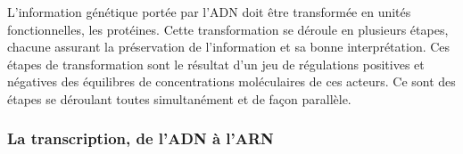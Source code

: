 L'information génétique portée par l'ADN doit être transformée en unités fonctionnelles, les protéines. Cette transformation  se déroule en plusieurs étapes, chacune assurant la préservation de l'information et sa bonne interprétation. Ces étapes de transformation sont le résultat d'un jeu de régulations positives et négatives des équilibres de concentrations moléculaires de ces acteurs. Ce sont des étapes se déroulant toutes simultanément et de façon parallèle.

\subsubsection{La transcription, de l'ADN à l'ARN}





